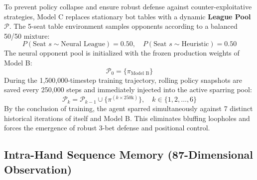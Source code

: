 To prevent policy collapse and ensure robust defense against counter-exploitative strategies, Model C replaces stationary bot tables with a dynamic \textbf{League Pool} $\mathcal{P}$. The 5-seat table environment samples opponents according to a balanced 50/50 mixture:
\begin{equation}
    P(\text{Seat } s \sim \text{Neural League}) = 0.50, \quad P(\text{Seat } s \sim \text{Heuristic}) = 0.50
\end{equation}
The neural opponent pool is initialized with the frozen production weights of Model B:
\begin{equation}
    \mathcal{P}_0 = \{\pi_{\text{Model B}}\}
\end{equation}
During the 1,500,000-timestep training trajectory, rolling policy snapshots are saved every 250,000 steps and immediately injected into the active sparring pool:
\begin{equation}
    \mathcal{P}_k = \mathcal{P}_{k-1} \cup \{\pi^{(k \times 250\text{k})}\}, \quad k \in \{1, 2, \dots, 6\}
\end{equation}
By the conclusion of training, the agent sparred simultaneously against 7 distinct historical iterations of itself and Model B. This eliminates bluffing loopholes and forces the emergence of robust 3-bet defense and positional control.

\subsection{Intra-Hand Sequence Memory (87-Dimensional Observation)}
\label{subsec:sequence_obs}


